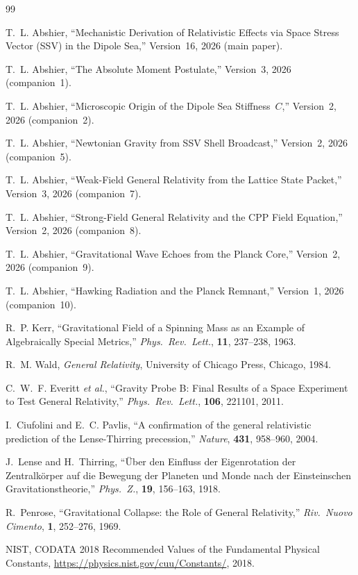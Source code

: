 \documentclass[12pt]{article}
\begin{document}
\begin{thebibliography}{99}

T.~L. Abshier,
``Mechanistic Derivation of Relativistic Effects via Space Stress
Vector (SSV) in the Dipole Sea,''
Version~16, 2026 (main paper).

T.~L. Abshier,
``The Absolute Moment Postulate,''
Version~3, 2026 (companion~1).

T.~L. Abshier,
``Microscopic Origin of the Dipole Sea Stiffness~$C$,''
Version~2, 2026 (companion~2).

T.~L. Abshier,
``Newtonian Gravity from SSV Shell Broadcast,''
Version~2, 2026 (companion~5).

T.~L. Abshier,
``Weak-Field General Relativity from the Lattice State Packet,''
Version~3, 2026 (companion~7).

T.~L. Abshier,
``Strong-Field General Relativity and the CPP Field Equation,''
Version~2, 2026 (companion~8).

T.~L. Abshier,
``Gravitational Wave Echoes from the Planck Core,''
Version~2, 2026 (companion~9).

T.~L. Abshier,
``Hawking Radiation and the Planck Remnant,''
Version~1, 2026 (companion~10).

R.~P. Kerr,
``Gravitational Field of a Spinning Mass as an Example of
Algebraically Special Metrics,''
\textit{Phys.\ Rev.\ Lett.}, \textbf{11}, 237--238, 1963.

R.~M. Wald,
\textit{General Relativity},
University of Chicago Press, Chicago, 1984.

C.~W.~F. Everitt \textit{et al.},
``Gravity Probe B: Final Results of a Space Experiment to Test
General Relativity,''
\textit{Phys.\ Rev.\ Lett.}, \textbf{106}, 221101, 2011.

I.~Ciufolini and E.~C. Pavlis,
``A confirmation of the general relativistic prediction of the
Lense-Thirring precession,''
\textit{Nature}, \textbf{431}, 958--960, 2004.

J.~Lense and H.~Thirring,
``\"Uber den Einfluss der Eigenrotation der Zentralk\"orper auf die
Bewegung der Planeten und Monde nach der Einsteinschen
Gravitationstheorie,''
\textit{Phys.\ Z.}, \textbf{19}, 156--163, 1918.

R.~Penrose,
``Gravitational Collapse: the Role of General Relativity,''
\textit{Riv.\ Nuovo Cimento}, \textbf{1}, 252--276, 1969.

NIST, CODATA 2018 Recommended Values of the Fundamental Physical
Constants, \url{https://physics.nist.gov/cuu/Constants/}, 2018.

\end{thebibliography}
\end{document}
